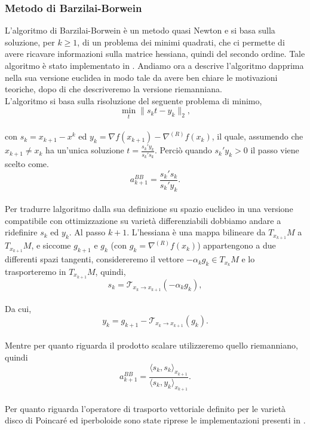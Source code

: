 \documentclass[a4paper, 12pt]{article}
\begin{document}
\subsubsection{Metodo di Barzilai-Borwein}
L'algoritmo di Barzilai-Borwein è un metodo quasi Newton e si basa sulla soluzione, per $k \geq 1$, di un problema dei minimi quadrati, che ci permette di avere ricavare informazioni sulla matrice hessiana, quindi del secondo ordine. Tale algoritmo è stato implementato in \cite{Iannazzo}. Andiamo ora a descrive l'algoritmo dapprima nella sua versione euclidea in modo tale da avere ben chiare le motivazioni teoriche, dopo di che descriveremo la versione riemanniana.\\
L'algoritmo si basa sulla risoluzione del seguente problema di minimo,\\
\[\min_{t} \parallel s_kt - y_k \parallel_2,\]\\
con $s_k = x_{k+1} - x^k$ ed $y_k = \nabla f(x_{k+1}) - \nabla^{(R)} f(x_k)$, il quale, assumendo che $x_{k+1} \neq x_k$ ha un'unica soluzione $t = \frac{s_k'y_k}{s_k's_k}$. Perciò quando $s_k'y_k > 0$ il passo viene scelto come.\\
\[a_{k+1}^{BB} = \frac{s_k's_k}{s_k'y_k}.\]\\
Per tradurre lalgoritmo dalla sua definizione su spazio euclideo in una versione compatibile con ottimizzazione su varietà differenziabili dobbiamo andare a ridefinire $s_k$ ed $y_k$. Al passo $k+1$. L'hessiana è una mappa bilineare da $T_{x_{k+1}}M$ a $T_{x_{k+1}}M$, e siccome $g_{k+1}$ e $g_{k}$ (con $g_k = \nabla^{(R)} f(x_k)$) appartengono a due differenti spazi tangenti, considereremo il vettore $-\alpha_kg_k \in T_{x_k}M$ e lo trasporteremo in $T_{x_{k+1}}M$, quindi,\\
\[s_k = \mathcal{T}_{x_k \to x_{k+1}}(-\alpha_kg_k),\]\\
Da cui,\\
\[y_k = g_{k+1} - \mathcal{T}_{x_k \to x_{k+1}}(g_k).\]\\
Mentre per quanto riguarda il prodotto scalare utilizzeremo quello riemanniano, quindi\\
\[a_{k+1}^{BB} = \frac{\langle s_k,s_k \rangle_{x_{k+1}}}{\langle s_k,y_k \rangle_{x_{k+1}}}.\]\\
Per quanto riguarda l'operatore di trasporto vettoriale definito per le varietà disco di Poincaré ed iperboloide sono state riprese le implementazioni presenti in \cite{ManOpt}.
\end{document}
